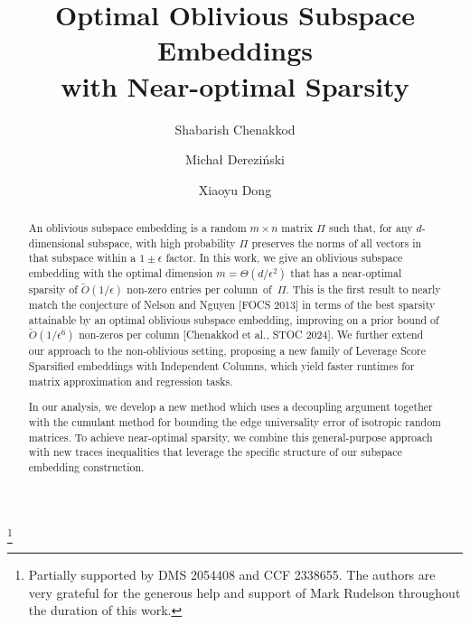 \documentclass[11pt]{amsart}
\numberwithin{equation}{section}
\numberwithin{equation}{section}
\theoremstyle{remark}
\theoremstyle{definition}
\begin{document}
\title[Optimal Oblivious Subspace Embeddings with Near-optimal Sparsity]{
Optimal Oblivious Subspace Embeddings \\with Near-optimal Sparsity
}
\author{Shabarish Chenakkod}
\author{Micha{\l} Derezi\'nski}
\author{Xiaoyu Dong}
\thanks{Partially supported by DMS 2054408 and CCF 2338655. The authors are very grateful for the generous help and support of Mark Rudelson throughout the duration of this work.}
\address{University of Michigan, Ann Arbor, MI, USA}
\address{National University of Singapore, Singapore}



\begin{abstract}
An oblivious subspace embedding is a random $m\times n$ matrix $\Pi$ such that, for any $d$-dimensional subspace, with high probability $\Pi$ preserves the norms of all vectors in that subspace within a $1\pm\epsilon$ factor. In this work, we give an oblivious subspace embedding with the optimal dimension $m=\Theta(d/\epsilon^2)$ that has a near-optimal sparsity of $\tilde O(1/\epsilon)$ non-zero entries per column~of~$\Pi$. This is the first result to nearly match the conjecture of Nelson and Nguyen [FOCS 2013] in terms of the best sparsity attainable by an optimal oblivious subspace embedding, improving on a prior bound of $\tilde O(1/\epsilon^6)$ non-zeros per column [Chenakkod et al., STOC 2024]. We further extend our approach to the non-oblivious setting, proposing a new family of Leverage Score Sparsified embeddings with Independent Columns, which yield faster runtimes for matrix approximation and regression tasks.

In our analysis, we develop a new method which uses a decoupling argument together with the cumulant method for bounding the edge universality error of isotropic random matrices. To achieve near-optimal sparsity, we combine this general-purpose approach with new traces inequalities that leverage the specific structure of our subspace embedding construction.
\end{abstract}

\maketitle
\thispagestyle{empty}
\newpage
\setcounter{page}{1}
\end{document}
